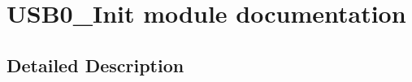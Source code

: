 \hypertarget{group___u_s_b0___init__module}{}\section{U\+S\+B0\+\_\+\+Init module documentation}
\label{group___u_s_b0___init__module}


\subsection{Detailed Description}
